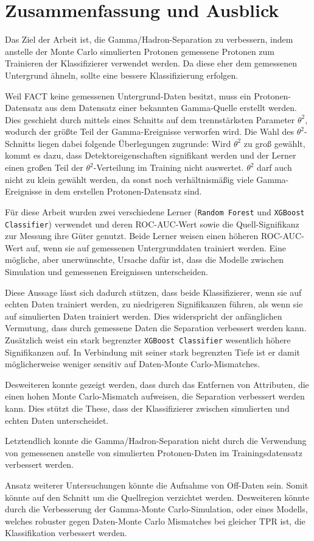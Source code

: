 \chapter{Zusammenfassung und Ausblick}
Das Ziel der Arbeit ist, die Gamma/Hadron-Separation zu verbessern, indem anstelle der Monte Carlo simulierten Protonen gemessene Protonen zum Trainieren der Klassifizierer verwendet werden. 
Da diese eher dem gemessenen Untergrund ähneln, sollte eine bessere Klassifizierung erfolgen.

Weil FACT keine gemessenen Untergrund-Daten besitzt, muss ein Protonen-Datensatz aus dem Datensatz einer bekannten Gamma-Quelle erstellt werden. 
Dies geschieht durch mittels eines Schnitts auf dem trennstärksten Parameter $\theta^{2}$, wodurch der größte Teil der Gamma-Ereignisse verworfen wird.
Die Wahl des $\theta^{2}$-Schnitts liegen dabei folgende Überlegungen zugrunde:
Wird $\theta^{2}$ zu groß gewählt, kommt es dazu, dass Detektoreigenschaften signifikant werden und der Lerner einen großen Teil der $\theta^{2}$-Verteilung im Training nicht auswertet. 
$\theta^{2}$ darf auch nicht zu klein gewählt werden, da sonst noch verhältnismäßig viele Gamma-Ereignisse in dem erstellen Protonen-Datensatz sind.

Für diese Arbeit wurden zwei verschiedene Lerner (\texttt{Random Forest} und \texttt{XGBoost Classifier}) verwendet und deren ROC-AUC-Wert sowie die Quell-Signifikanz zur Messung ihre Güter genutzt. 
Beide Lerner weisen einen höheren ROC-AUC-Wert auf, wenn sie auf gemessenen Untergrunddaten trainiert werden.
Eine mögliche, aber unerwünschte, Ursache dafür ist, dass die Modelle zwischen Simulation und gemessenen Ereignissen unterscheiden.

Diese Aussage lässt sich dadurch stützen, dass beide Klassifizierer, wenn sie auf echten Daten trainiert werden, zu niedrigeren Signifikanzen führen, als wenn sie auf simulierten Daten trainiert werden. 
Dies widerspricht der anfänglichen Vermutung, dass durch gemessene Daten die Separation verbessert werden kann. 
Zusätzlich weist ein stark begrenzter \texttt{XGBoost Classifier} wesentlich höhere Signifikanzen auf. 
In Verbindung mit seiner stark begrenzten Tiefe ist er damit möglicherweise weniger sensitiv auf Daten-Monte Carlo-Mismatches. 

Desweiteren konnte gezeigt werden, dass durch das Entfernen von Attributen, die einen hohen Monte Carlo-Mismatch aufweisen, die Separation verbessert werden kann. 
Dies stützt die These, dass der Klassifizierer zwischen simulierten und echten Daten unterscheidet.

Letztendlich konnte die Gamma/Hadron-Separation nicht durch die Verwendung von gemessenen anstelle von simulierten Protonen-Daten im Trainingsdatensatz verbessert werden. 

Ansatz weiterer Untersuchungen könnte die Aufnahme von Off-Daten sein.
Somit könnte auf den Schnitt um die Quellregion verzichtet werden. 
Desweiteren könnte durch die Verbesserung der Gamma-Monte Carlo-Simulation, oder eines Modells, welches robuster gegen Daten-Monte Carlo Mismatches bei gleicher TPR ist, die Klassifikation verbessert werden.
